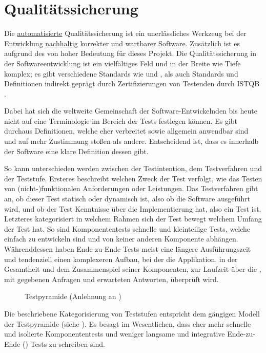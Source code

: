 \section{Qualitätssicherung}\label{sec:qualitaetssicherung}

Die \underline{automatisierte} Qualitätssicherung ist ein unerlässliches Werkzeug bei der Entwicklung \underline{nachhaltig} korrekter und wartbarer Software.
Zusätzlich ist es aufgrund des  von hoher Bedeutung für dieses Projekt.
Die Qualitätssicherung in der Softwareentwicklung ist ein vielfältiges Feld und in der Breite wie Tiefe komplex; es gibt verschiedene Standards wie  und , als auch Standards und Definitionen indirekt geprägt durch Zertifizierungen von Testenden durch ISTQB .

Dabei hat sich die weltweite Gemeinschaft der Software-Entwickelnden bis heute nicht auf eine Terminologie im Bereich der Tests festlegen können.
Es gibt durchaus Definitionen, welche eher verbreitet sowie allgemein anwendbar sind und auf mehr Zustimmung stoßen als andere.
Entscheidend ist, dass es innerhalb der Software eine klare Definition dessen gibt.

So kann unterschieden werden zwischen der Testintention, dem Testverfahren und der Teststufe.
Ersteres beschreibt welchen Zweck der Test verfolgt, wie \zB das Testen von (nicht-)funktionalen Anforderungen oder Leistungen.
Das Testverfahren gibt an, ob dieser Test statisch oder dynamisch ist, also ob die Software ausgeführt wird, und ob der Test Kenntnisse über die Implementierung hat, also ein  Test ist.
Letzteres kategorisiert in welchem Rahmen sich der Test bewegt \bzw welchem Umfang der Test hat.
So sind \idR \zB Komponententests schnelle und kleinteilige Tests, welche einfach zu entwickeln sind und von keiner anderen Komponente abhängen.
Währenddessen haben Ende-zu-Ende Tests meist eine längere Ausführungszeit und tendenziell einen komplexeren Aufbau, bei der die Applikation, in der Gesamtheit und dem Zusammenspiel seiner Komponenten, zur Laufzeit über die , mit gegebenen Anfragen und erwarteten Antworten, überprüft wird.

\begin{figure}%
    \vspace{.25em}
    \centering
    \captionsetup{labelsep=newline,format=plain,justification=centering}
    \caption{Testpyramide (Anlehnung an )}\label{fig:test-pyramide}
    \vspace{.75em}
\end{figure}%
Die beschriebene Kategorisierung von Teststufen entspricht dem gängigen Modell der Testpyramide (siehe ).
Es besagt im Wesentlichen, dass eher mehr schnelle und isolierte Komponententests und weniger langsame und integrative Ende-zu-Ende () Tests zu schreiben sind.

